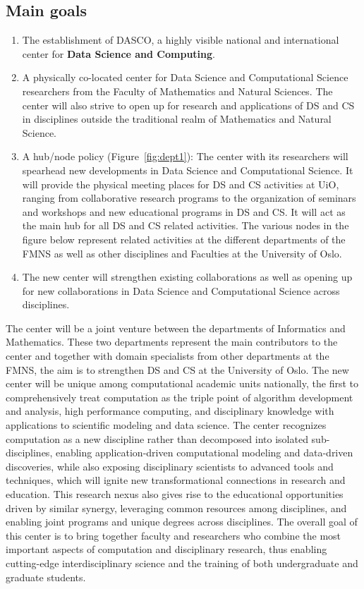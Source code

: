 \documentclass[a4paper,10pt]{article}
\begin{document}
\subsection{Main goals}
\begin{enumerate}
\item The establishment  of DASCO, a highly visible  national and international center for {\bf Data Science and Computing}. 
\item A physically co-located center for Data Science and Computational Science researchers from the Faculty of Mathematics and Natural Sciences. The center will also strive to open up for research and applications of DS and CS in disciplines outside the traditional realm of Mathematics and Natural Science.  
\item A hub/node policy (Figure~\ref{fig:dept1}): The center with its researchers will spearhead new developments in Data Science and Computational Science. It will  provide the physical meeting places for DS and CS activities at UiO, ranging from collaborative research programs to the organization of seminars and workshops and new educational programs in DS and CS. It will act as the main hub for all DS and CS related activities. The various nodes in the figure below represent  related activities at the different departments of the FMNS as well as other disciplines and Faculties at the University of Oslo. 
\item The new center will strengthen  existing collaborations as well as opening up for new  collaborations in Data Science and Computational Science across disciplines.  
\end{enumerate}

The center will be a joint venture  between the departments of Informatics and Mathematics. These two departments represent the main contributors to the center and together with domain specialists from other departments at the FMNS, the aim is to strengthen DS and CS at the University of Oslo.
The new center will be unique among computational academic units nationally, the first to comprehensively treat computation as the triple point of algorithm development and analysis, high performance computing, and disciplinary knowledge with applications to scientific modeling and data science. The center recognizes computation as a new discipline rather than decomposed into isolated sub-disciplines, enabling application-driven computational modeling and data-driven discoveries, while also exposing disciplinary scientists  to advanced tools and techniques, which will ignite new transformational connections in research and education. This research nexus also gives rise to the educational opportunities driven by similar synergy, leveraging common resources among disciplines, and enabling joint programs and unique degrees across disciplines. The overall goal of this center is to bring together faculty and researchers who combine the most important aspects of computation and disciplinary research, thus enabling cutting-edge interdisciplinary science and the training of both undergraduate and graduate students.
\end{document}
